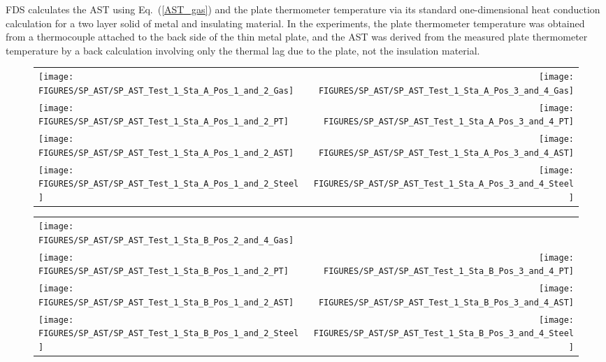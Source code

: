 FDS calculates the AST using Eq.~(\ref{AST_gas}) and the plate thermometer temperature via its standard one-dimensional heat conduction calculation for a
two layer solid of metal and insulating material. In the experiments, the plate thermometer temperature was obtained from a thermocouple attached to the back side of
the thin metal plate, and the AST was derived from the measured plate thermometer temperature by a back calculation involving only the thermal lag due to the
plate, not the insulation material.

\newpage


\begin{figure}[p]
\begin{tabular*}{\textwidth}{l@{\extracolsep{\fill}}r}
\texttt{[image: FIGURES/SP\_AST/SP\_AST\_Test\_1\_Sta\_A\_Pos\_1\_and\_2\_Gas]} &
\texttt{[image: FIGURES/SP\_AST/SP\_AST\_Test\_1\_Sta\_A\_Pos\_3\_and\_4\_Gas]} \\
\texttt{[image: FIGURES/SP\_AST/SP\_AST\_Test\_1\_Sta\_A\_Pos\_1\_and\_2\_PT]} &
\texttt{[image: FIGURES/SP\_AST/SP\_AST\_Test\_1\_Sta\_A\_Pos\_3\_and\_4\_PT]} \\
\texttt{[image: FIGURES/SP\_AST/SP\_AST\_Test\_1\_Sta\_A\_Pos\_1\_and\_2\_AST]} &
\texttt{[image: FIGURES/SP\_AST/SP\_AST\_Test\_1\_Sta\_A\_Pos\_3\_and\_4\_AST]} \\
\texttt{[image: FIGURES/SP\_AST/SP\_AST\_Test\_1\_Sta\_A\_Pos\_1\_and\_2\_Steel]} &
\texttt{[image: FIGURES/SP\_AST/SP\_AST\_Test\_1\_Sta\_A\_Pos\_3\_and\_4\_Steel]}
\end{tabular*}
\label{SP_Test_1_Station_A}
\end{figure}

\begin{figure}[p]
\begin{tabular*}{\textwidth}{l@{\extracolsep{\fill}}r}
\texttt{[image: FIGURES/SP\_AST/SP\_AST\_Test\_1\_Sta\_B\_Pos\_2\_and\_4\_Gas]} &
  \\
\texttt{[image: FIGURES/SP\_AST/SP\_AST\_Test\_1\_Sta\_B\_Pos\_1\_and\_2\_PT]} &
\texttt{[image: FIGURES/SP\_AST/SP\_AST\_Test\_1\_Sta\_B\_Pos\_3\_and\_4\_PT]} \\
\texttt{[image: FIGURES/SP\_AST/SP\_AST\_Test\_1\_Sta\_B\_Pos\_1\_and\_2\_AST]} &
\texttt{[image: FIGURES/SP\_AST/SP\_AST\_Test\_1\_Sta\_B\_Pos\_3\_and\_4\_AST]} \\
\texttt{[image: FIGURES/SP\_AST/SP\_AST\_Test\_1\_Sta\_B\_Pos\_1\_and\_2\_Steel]} &
\texttt{[image: FIGURES/SP\_AST/SP\_AST\_Test\_1\_Sta\_B\_Pos\_3\_and\_4\_Steel]}
\end{tabular*}
\label{SP_Test_1_Station_B}
\end{figure}


